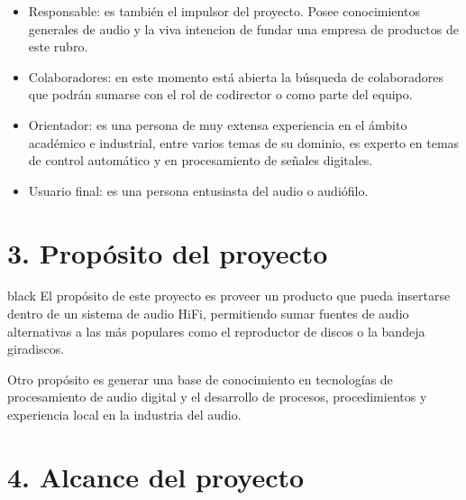 \documentclass[
11pt, %
]{charter}
\begin{document}
\begin{itemize}
	\item Responsable: es también el impulsor del proyecto. Posee conocimientos generales de audio y la viva intencion de fundar una empresa de productos de este rubro. 
	\item Colaboradores: en este momento está abierta la búsqueda de colaboradores que podrán sumarse con el rol de codirector o como parte del equipo.
	\item Orientador: es una persona de muy extensa experiencia en el ámbito académico e industrial, entre varios temas de su dominio, es experto en temas de control automático y en procesamiento de señales digitales.
	\item Usuario final: es una persona entusiasta del audio o audiófilo.
\end{itemize}

\section{3. Propósito del proyecto}
\label{sec:proposito}

\begin{consigna}{black}
El propósito de este proyecto es proveer un producto que pueda insertarse dentro de un sistema de audio HiFi, permitiendo sumar fuentes de audio alternativas a las más populares como el reproductor de discos o la bandeja giradiscos.
 
Otro propósito es generar una base de conocimiento en tecnologías de procesamiento de audio digital y el desarrollo de procesos, procedimientos y experiencia local en la industria del audio. 
\end{consigna}





\section{4. Alcance del proyecto}
\label{sec:alcance}
\end{document}
